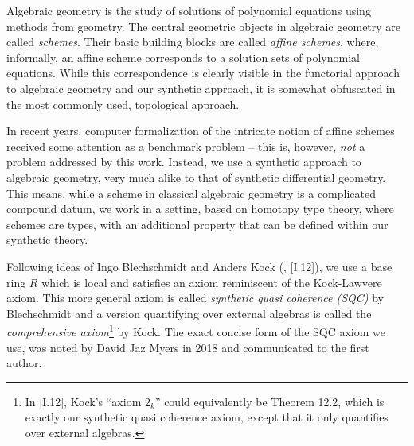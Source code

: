 
Algebraic geometry is the study of solutions of polynomial equations using methods from geometry.
The central geometric objects in algebraic geometry are called \emph{schemes}.
Their basic building blocks are called \emph{affine schemes},
where, informally, an affine scheme corresponds to a solution sets of polynomial equations.
While this correspondence is clearly visible in the functorial approach to algebraic geometry and our synthetic approach,
it is somewhat obfuscated in the most commonly used, topological approach.

In recent years,
computer formalization of the intricate notion of affine schemes
received some attention as a benchmark problem
-- this is, however, \emph{not} a problem addressed by this work.
Instead, we use a synthetic approach to algebraic geometry,
very much alike to that of synthetic differential geometry.
This means, while a scheme in classical algebraic geometry is a complicated compound datum,
we work in a setting, based on homotopy type theory, where schemes are types,
with an additional property that can be defined within our synthetic theory.

Following ideas of Ingo Blechschmidt and Anders Kock  (\cite{ingo-thesis}, \cite{kock-sdg}[I.12]),
we use a base ring $R$ which is local and satisfies an axiom reminiscent of the Kock-Lawvere axiom.
This more general axiom is called \emph{synthetic quasi coherence (SQC)} by Blechschmidt and
a version quantifying over external algebras is called the \emph{comprehensive axiom}\footnote{
  In \cite{kock-sdg}[I.12], Kock's ``axiom $2_k$'' could equivalently be Theorem 12.2,
  which is exactly our synthetic quasi coherence axiom, except that it only quantifies over external algebras.
}
by Kock.
The exact concise form of the SQC axiom we use, was noted by David Jaz Myers in 2018 and communicated to the first author.

